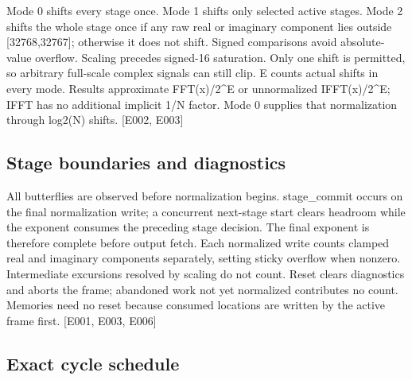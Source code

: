 \documentclass[11pt,a4paper]{article}
\begin{document}
Mode 0 shifts every stage once. Mode 1 shifts only selected active stages. Mode 2 shifts the whole stage once if any raw real or imaginary component lies outside [32768,\allowbreak{}32767]\allowbreak{}; otherwise it does not shift. Signed comparisons avoid absolute-value overflow. Scaling precedes signed-16 saturation. Only one shift is permitted,\allowbreak{} so arbitrary full-scale complex signals can still clip. E counts actual shifts in every mode. Results approximate FFT(\allowbreak{}x)\allowbreak{}/\allowbreak{}2\textasciicircum{}E or unnormalized IFFT(\allowbreak{}x)\allowbreak{}/\allowbreak{}2\textasciicircum{}E; IFFT has no additional implicit 1/\allowbreak{}N factor. Mode 0 supplies that normalization through log2(\allowbreak{}N)\allowbreak{} shifts. [\allowbreak{}E002,\allowbreak{} E003]\allowbreak{}

\subsection{Stage boundaries and diagnostics}

All butterflies are observed before normalization begins. stage\_\allowbreak{}commit occurs on the final normalization write; a concurrent next-stage start clears headroom while the exponent consumes the preceding stage decision. The final exponent is therefore complete before output fetch. Each normalized write counts clamped real and imaginary components separately,\allowbreak{} setting sticky overflow when nonzero. Intermediate excursions resolved by scaling do not count. Reset clears diagnostics and aborts the frame; abandoned work not yet normalized contributes no count. Memories need no reset because consumed locations are written by the active frame first. [\allowbreak{}E001,\allowbreak{} E003,\allowbreak{} E006]\allowbreak{}

\subsection{Exact cycle schedule}
\end{document}
